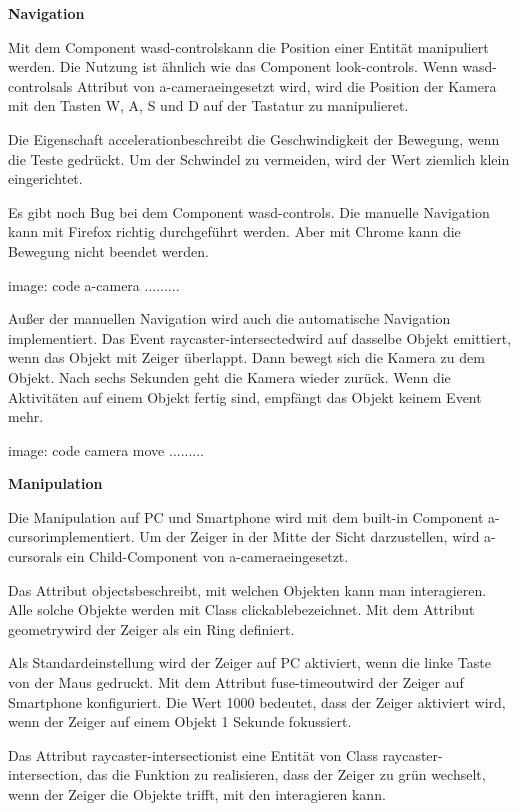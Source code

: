   \textbf{Navigation}
  
  Mit dem Component \glqq wasd-controls\grqq kann die Position einer Entität manipuliert werden. Die Nutzung ist ähnlich wie das Component \glqq look-controls\grqq. Wenn \grqq wasd-controls\grqq als Attribut von \glqq a-camera\grqq eingesetzt wird, wird die Position der Kamera mit den Tasten W, A, S und D auf der Tastatur zu manipulieret.
  
  Die Eigenschaft \glqq acceleration\grqq beschreibt die Geschwindigkeit der Bewegung, wenn die Teste gedrückt. Um der Schwindel zu vermeiden, wird der Wert ziemlich klein eingerichtet.
  
  Es gibt noch Bug bei dem Component \glqq wasd-controls\grqq. Die manuelle Navigation kann mit Firefox richtig durchgeführt werden. Aber mit Chrome kann die Bewegung nicht beendet werden.
  
  image: code a-camera .........
  
  Außer der manuellen Navigation wird auch die automatische Navigation implementiert. Das Event \glqq raycaster-intersected\grqq wird auf dasselbe Objekt emittiert, wenn das Objekt mit Zeiger überlappt. Dann bewegt sich die Kamera zu dem Objekt. Nach sechs Sekunden geht die Kamera wieder zurück. Wenn die Aktivitäten auf einem Objekt fertig sind, empfängt das Objekt keinem Event mehr.
  
  image: code camera move .........
  
  \textbf{Manipulation}
  
  Die Manipulation auf PC und Smartphone wird mit dem built-in Component \glqq a-cursor\grqq implementiert. Um der Zeiger in der Mitte der Sicht darzustellen, wird \glqq a-cursor\grqq als ein Child-Component von \glqq a-camera\grqq eingesetzt.
  
  Das Attribut \glqq objects\grqq beschreibt, mit welchen Objekten kann man interagieren. Alle solche Objekte werden mit Class \glqq clickable\grqq bezeichnet. Mit dem Attribut \glqq geometry\grqq wird der Zeiger als ein Ring definiert.
  
  Als Standardeinstellung wird der Zeiger auf PC aktiviert, wenn die linke Taste von der Maus gedruckt. Mit dem Attribut \glqq fuse-timeout\grqq wird der Zeiger auf Smartphone konfiguriert. Die Wert 1000 bedeutet, dass der Zeiger aktiviert wird, wenn der Zeiger auf einem Objekt 1 Sekunde fokussiert.
  
  Das Attribut \glqq raycaster-intersection\grqq ist eine Entität von Class \glqq raycaster-intersection\grqq, das die Funktion zu realisieren, dass der Zeiger zu grün wechselt, wenn der Zeiger die Objekte trifft, mit den interagieren kann.
  
